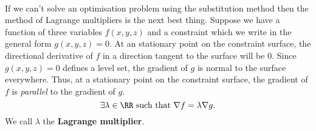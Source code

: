 \documentclass[../multivariate_calculus.tex]{subfiles}
\begin{document}
        \paragraph{}
        If we can't solve an optimisation problem using the substitution method then the method of Lagrange multipliers is the next best thing.
        Suppose we have a function of three variables $f(x,y,z)$ and a constraint which we write in the general form $g(x,y,z)=0$.
        At an stationary point on the constraint surface, the directional derivative of $f$ in a direction tangent to the surface will be 0.
        Since $g(x,y,z)=0$ defines a level set, the gradient of $g$ is normal to the surface everywhere.
        Thus, at a stationary point on the constraint surface, the gradient of $f$ is \textit{parallel} to the gradient of $g$.
        \begin{equation}
            \exists\lambda\in\RR\text{ such that }\nabla f=\lambda\nabla g.
        \end{equation}
        We call $\lambda$ the \textbf{Lagrange multiplier}.
\end{document}
